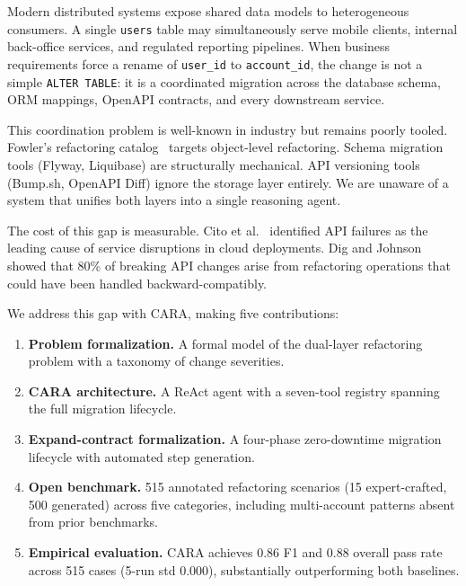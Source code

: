 \documentclass[10pt,twocolumn]{article}
\begin{document}
Modern distributed systems expose shared data models to heterogeneous consumers.
A single \texttt{users} table may simultaneously serve mobile clients, internal
back-office services, and regulated reporting pipelines. When business requirements
force a rename of \texttt{user\_id} to \texttt{account\_id}, the change is not
a simple \texttt{ALTER TABLE}: it is a coordinated migration across the database
schema, ORM mappings, OpenAPI contracts, and every downstream service.

This coordination problem is well-known in industry but remains poorly tooled.
Fowler's refactoring catalog~\cite{fowler1999refactoring} targets object-level
refactoring. Schema migration tools (Flyway, Liquibase) are structurally mechanical.
API versioning tools (Bump.sh, OpenAPI Diff) ignore the storage layer entirely.
We are unaware of a system that unifies both layers into a single reasoning agent.

The cost of this gap is measurable. Cito et al.~\cite{cito2021empirical} identified
API failures as the leading cause of service disruptions in cloud deployments.
Dig and Johnson~\cite{dig2006api} showed that 80\% of breaking API changes arise
from refactoring operations that could have been handled backward-compatibly.

We address this gap with CARA, making five contributions:

\begin{enumerate}[leftmargin=*,itemsep=1pt,topsep=2pt]
  \item \textbf{Problem formalization.} A formal model of the dual-layer refactoring
  problem with a taxonomy of change severities.
  \item \textbf{CARA architecture.} A ReAct agent with a seven-tool registry
  spanning the full migration lifecycle.
  \item \textbf{Expand-contract formalization.} A four-phase zero-downtime
  migration lifecycle with automated step generation.
  \item \textbf{Open benchmark.} 515 annotated refactoring scenarios (15
  expert-crafted, 500 generated) across five categories, including multi-account
  patterns absent from prior benchmarks.
  \item \textbf{Empirical evaluation.} CARA achieves 0.86 F1 and 0.88 overall
  pass rate across 515 cases (5-run std 0.000), substantially outperforming
  both baselines.
\end{enumerate}

\end{document}
